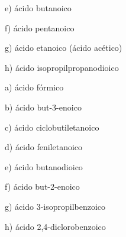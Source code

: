\documentclass{article}
\begin{document}
e) 
ácido butanoico

f) 
ácido pentanoico

g) 
ácido etanoico (ácido acético)

h)
ácido isopropilpropanodioico

a) ácido fórmico

b) ácido but-3-enoico

c) ácido ciclobutiletanoico

d) ácido feniletanoico

e) ácido butanodioico

f) ácido but-2-enoico

g) ácido 3-isopropilbenzoico


h) ácido 2,4-diclorobenzoico
\end{document}

